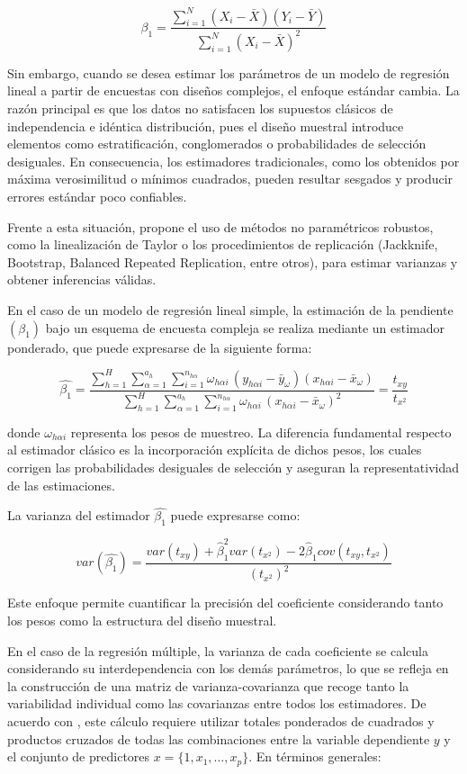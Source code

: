 \documentclass[
  spanish,
  12pt,
]{book}
\begin{document}
\[
\beta_{1}  =  \frac{\sum_{i=1}^{N}\left(X_{i}-\bar{X}\right)\left(Y_{i}-\bar{Y}\right)}{\sum_{i=1}^{N}\left(X_{i}-\bar{X}\right)^{2}}
\]

Sin embargo, cuando se desea estimar los parámetros de un modelo de regresión lineal a partir de encuestas con diseños complejos, el enfoque estándar cambia. La razón principal es que los datos no satisfacen los supuestos clásicos de independencia e idéntica distribución, pues el diseño muestral introduce elementos como estratificación, conglomerados o probabilidades de selección desiguales. En consecuencia, los estimadores tradicionales, como los obtenidos por máxima verosimilitud o mínimos cuadrados, pueden resultar sesgados y producir errores estándar poco confiables.

Frente a esta situación, \citet{wolter2007} propone el uso de métodos no paramétricos robustos, como la linealización de Taylor o los procedimientos de replicación (Jackknife, Bootstrap, Balanced Repeated Replication, entre otros), para estimar varianzas y obtener inferencias válidas.

En el caso de un modelo de regresión lineal simple, la estimación de la pendiente \((\beta_1)\) bajo un esquema de encuesta compleja se realiza mediante un estimador ponderado, que puede expresarse de la siguiente forma:

\[
\hat{\beta_{1}}  =  
\frac{\sum_{h=1}^H \sum_{\alpha=1}^{a_h} \sum_{i=1}^{n_{h\alpha}} \omega_{h\alpha i}\,(y_{h\alpha i}-\bar{y}_{\omega})(x_{h\alpha i}-\bar{x}_{\omega})}
{\sum_{h=1}^H \sum_{\alpha=1}^{a_h} \sum_{i=1}^{n_{h\alpha}} \omega_{h\alpha i}\,(x_{h\alpha i}-\bar{x}_{\omega})^{2}}
= \frac{t_{xy}}{t_{x^{2}}}
\]

donde \(\omega_{h\alpha i}\) representa los pesos de muestreo. La diferencia fundamental respecto al estimador clásico es la incorporación explícita de dichos pesos, los cuales corrigen las probabilidades desiguales de selección y aseguran la representatividad de las estimaciones.

La varianza del estimador \(\hat{\beta_1}\) puede expresarse como:

\[
var\left(\hat{\beta_{1}}\right)  
=  \frac{var(t_{xy})+\hat{\beta}_{1}^{2}var(t_{x^{2}})-2\hat{\beta}_{1}cov(t_{xy},t_{x^{2}})}{(t_{x^{2}})^{2}}
\]

Este enfoque permite cuantificar la precisión del coeficiente considerando tanto los pesos como la estructura del diseño muestral.

En el caso de la regresión múltiple, la varianza de cada coeficiente se calcula considerando su interdependencia con los demás parámetros, lo que se refleja en la construcción de una matriz de varianza-covarianza que recoge tanto la variabilidad individual como las covarianzas entre todos los estimadores. De acuerdo con \citet{kish1974inference}, este cálculo requiere utilizar totales ponderados de cuadrados y productos cruzados de todas las combinaciones entre la variable dependiente \(y\) y el conjunto de predictores \(x = \{1, x_1, \ldots, x_p\}\). En términos generales:
\end{document}
